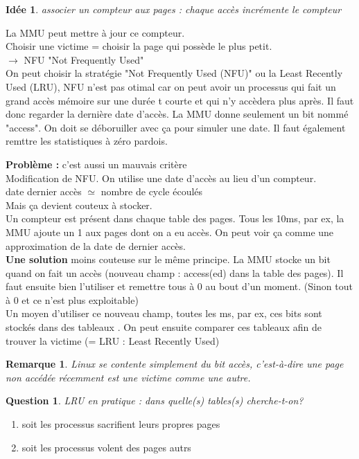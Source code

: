 \documentclass[12pt,a4paper]{report}
\newtheorem*{rem}{Remarque}
\newtheorem*{q}{Question}
\newtheorem*{id}{Idée}
\begin{document}
\begin{id}associer un compteur aux pages : chaque accès incrémente le compteur\end{id}
La MMU peut mettre à jour ce compteur.\\
Choisir une victime = choisir la page qui possède le plus petit.\\
$\rightarrow$ NFU "Not Frequently Used" \\
On peut choisir la stratégie "Not Frequently Used (NFU)" ou la Least Recently Used (LRU),
NFU n'est pas otimal car on peut avoir un processus qui fait un grand accès mémoire sur une durée t courte et qui n'y accèdera plus après.
Il faut donc regarder la dernière date d'accès.
La MMU donne seulement un bit nommé "access". On doit se déboruiller avec ça pour simuler une date. Il faut également remttre les statistiques à zéro pardois.

\textbf{Problème :} c'est aussi un mauvais critère\\

Modification de NFU. On utilise une date d'accès au lieu d'un compteur.\\
date dernier accès $\simeq$ nombre de cycle écoulés\\
Mais ça devient couteux à stocker.\\
Un compteur est présent dans chaque table des pages. Tous les 10ms, par ex, la MMU ajoute un 1 aux pages dont on a eu accès. On peut voir ça comme une approximation de la date de dernier accès.\\

\textbf{Une solution} moins couteuse sur le même principe. La MMU stocke un bit quand on fait un accès (nouveau champ : access(ed) dans la table des pages). Il faut ensuite bien l'utiliser et remettre tous à 0 au bout d'un moment. (Sinon tout à 0 et ce n'est plus exploitable)\\
Un moyen d'utiliser ce nouveau champ, toutes les ms, par ex, ces bits sont stockés dans des tableaux .
On peut ensuite comparer ces tableaux afin de trouver la victime (= LRU : Least Recently Used)\\

\begin{rem}Linux se contente simplement du bit accès, c'est-à-dire une page non accédée récemment est une victime comme une autre.\end{rem}

\begin{q}LRU en pratique : dans quelle(s) tables(s) cherche-t-on?\end{q}
\begin{enumerate}
\item soit les processus sacrifient leurs propres pages
\item soit les processus volent des pages autrs
\end{enumerate}
\end{document}
